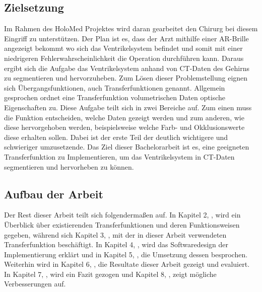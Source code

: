 \subsection{Zielsetzung}

Im Rahmen des HoloMed Projektes wird daran gearbeitet den Chirurg bei diesem Eingriff zu unterstützen. Der Plan ist es, dass der Arzt mithilfe einer AR-Brille angezeigt bekommt wo sich das Ventrikelsystem befindet und somit mit einer niedrigeren Fehlerwahrscheinlichkeit die Operation durchführen kann. Daraus ergibt sich die Aufgabe das Ventrikelsystem anhand von CT-Daten des Gehirns zu segmentieren und hervorzuheben.
\newline
Zum Lösen dieser Problemstellung eignen sich Übergangsfunktionen, auch Transferfunktionen genannt. Allgemein gesprochen ordnet eine Transferfunktion volumetrischen Daten optische Eigenschaften zu. Diese Aufgabe teilt sich in zwei Bereiche auf. Zum einen muss die Funktion entscheiden, welche Daten gezeigt werden und zum anderen, wie diese hervorgehoben werden, beispielsweise welche Farb- und Okklusionswerte diese erhalten sollen. Dabei ist der erste Teil der deutlich wichtigere und schwieriger umzusetzende.
\newline
Das Ziel dieser Bachelorarbeit ist es, eine geeigneten Transferfunktion zu Implementieren, um das Ventrikelsystem in CT-Daten segmentieren und hervorheben zu können.



\subsection{Aufbau der Arbeit}

Der Rest dieser Arbeit teilt sich folgendermaßen auf. In Kapitel 2, , wird ein Überblick über existierenden Transferfunktionen und deren Funktionsweisen gegeben, während sich Kapitel 3, , mit der in dieser Arbeit verwendeten Transferfunktion beschäftigt. In Kapitel 4, , wird das Softwaredesign der Implementierung erklärt und in Kapitel 5, , die Umsetzung dessen besprochen. Weiterhin wird in Kapitel 6, , die Resultate dieser Arbeit gezeigt und evaluiert. In Kapitel 7, , wird ein Fazit gezogen und Kapitel 8, , zeigt mögliche Verbesserungen auf.